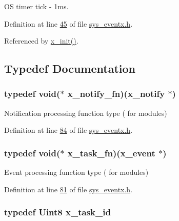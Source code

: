 O\+S timer tick -\/ 1ms. 



Definition at line \hyperlink{a00036_source_l00045}{45} of file \hyperlink{a00036_source}{sys\+\_\+eventx.\+h}.



Referenced by \hyperlink{a00037_source_l00135}{x\+\_\+init()}.



\subsection{Typedef Documentation}
\hypertarget{a00036_a29c1adcba84e0c3e83657c91e9b2b764}{
\subsubsection[{x\+\_\+notify\+\_\+fn}]{\setlength{\rightskip}{0pt plus 5cm}typedef void($\ast$  x\+\_\+notify\+\_\+fn)({\bf x\+\_\+notify} $\ast$)}}\label{a00036_a29c1adcba84e0c3e83657c91e9b2b764}


Notification processing function type ( for modules) 



Definition at line \hyperlink{a00036_source_l00084}{84} of file \hyperlink{a00036_source}{sys\+\_\+eventx.\+h}.

\hypertarget{a00036_ace830f248538d21bb16ea9c00997fcd7}{
\subsubsection[{x\+\_\+task\+\_\+fn}]{\setlength{\rightskip}{0pt plus 5cm}typedef void($\ast$  x\+\_\+task\+\_\+fn)({\bf x\+\_\+event} $\ast$)}}\label{a00036_ace830f248538d21bb16ea9c00997fcd7}


Event processing function type ( for modules) 



Definition at line \hyperlink{a00036_source_l00081}{81} of file \hyperlink{a00036_source}{sys\+\_\+eventx.\+h}.

\hypertarget{a00036_ad5c3c5fbfd3e4aadf22830395484a71d}{
\subsubsection[{x\+\_\+task\+\_\+id}]{\setlength{\rightskip}{0pt plus 5cm}typedef {\bf Uint8} {\bf x\+\_\+task\+\_\+id}}}\label{a00036_ad5c3c5fbfd3e4aadf22830395484a71d}



